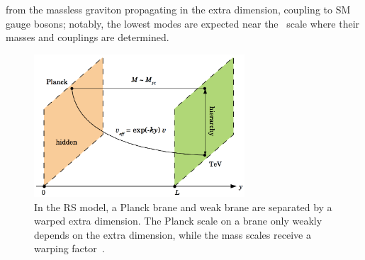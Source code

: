 from the massless graviton propagating in the extra dimension, coupling to SM gauge bosons; notably, the lowest modes are expected near the \TeV\, scale where their masses and couplings are determined.

\begin{figure}[tbp]
\begin{center}
\includegraphics[width=0.7\textwidth]{figures/StandardModel/rs_branes}
\end{center}
\caption[Schematic of warped extra dimensions]{In the RS model, a Planck brane and weak brane are separated by a warped extra dimension. The Planck scale on a brane only weakly depends on the extra dimension, while the mass scales receive a warping factor~\cite{rs_pic}.}
\label{fig:rs_branes}
\end{figure} 

